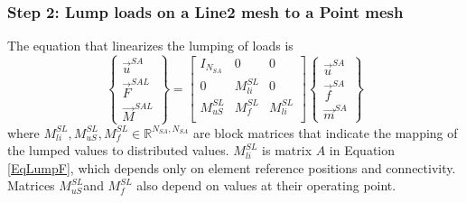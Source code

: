 \documentclass[10pt,letterpaper,oneside,notitlepage]{article}
\begin{document}
\subsubsection{Step 2: Lump loads on a Line2 mesh to a Point mesh}
The equation that linearizes the lumping of loads is
\begin{equation}
\label{Lump}
	\left\{	\begin{matrix} \vec{u}^{SA} \\ \vec{F}^{SAL} \\ \vec{M}^{SAL} \end{matrix} \right\} 
=
	\begin{bmatrix}
	 I_{\mathit{N_{SA}}} & 0   				 & 0   \\
	 0  								 & M_{li}^{SL} & 0   \\
	 M_{uS}^{SL}    		 & M_{f}^{SL}  & M_{li}^{SL} \\
	\end{bmatrix}
	\left\{	\begin{matrix} \vec{u}^{SA} \\ \vec{f}^{SA} \\ \vec{m}^{SA} \end{matrix} \right\} 
\end{equation}
where $M_{li}^{SL}, M_{uS}^{SL}, M_{f}^{SL} \in \mathbb{R}^{ \mathit{N_{SA}},\mathit{N_{SA}}}$ are block matrices that indicate the mapping of the lumped values to distributed values. $M_{li}^{SL}$ is matrix $A$ in Equation \ref{EqLumpF}, which depends only on element reference positions and connectivity. Matrices $M_{uS}^{SL}$and $M_{f}^{SL}$ also depend on values at their operating point.
\end{document}
